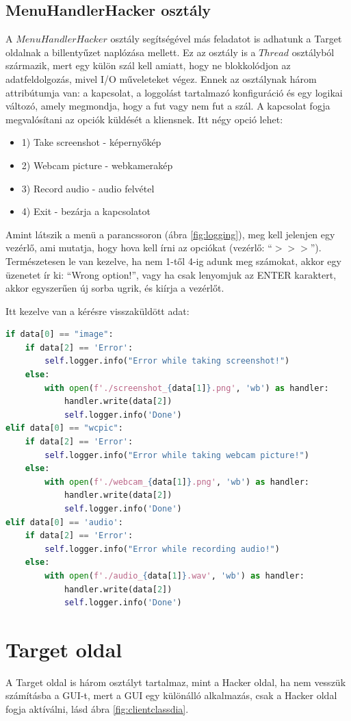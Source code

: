 \documentclass[12pt,a4paper,oneside]{report}
\begin{document}
\subsection{MenuHandlerHacker osztály}\label{subsubsec:menuhandler}
A $MenuHandlerHacker$ osztály segítségével más feladatot is adhatunk a Target oldalnak a billentyűzet naplózása mellett. Ez az osztály is a $Thread$ osztályból származik, mert egy külön szál kell amiatt, hogy ne blokkolódjon az adatfeldolgozás, mivel I/O műveleteket végez.  Ennek az osztálynak három attribútumja van: a kapcsolat, a loggolást tartalmazó konfiguráció és egy logikai változó, amely megmondja, hogy a fut vagy nem fut a szál. A kapcsolat fogja megvalósítani az opciók küldését a kliensnek. Itt négy opció lehet:
\begin{itemize}
\item 1) Take screenshot - képernyőkép
\item 2) Webcam picture - webkamerakép
\item 3) Record audio - audio felvétel
\item 4) Exit - bezárja a kapcsolatot
\end{itemize}

Amint látszik a menü a parancssoron (ábra \ref{fig:logging}), meg kell jelenjen egy vezérlő, ami mutatja, hogy hova kell írni az opciókat (vezérlő: ``$>>>$'').
Természetesen le van kezelve, ha nem 1-től 4-ig adunk meg számokat, akkor egy üzenetet ír ki: ``Wrong option!'', vagy ha csak lenyomjuk az ENTER karaktert, akkor egyszerűen új sorba ugrik, és kiírja a vezérlőt.

Itt kezelve van a kérésre visszaküldött adat:
\begin{lstlisting}[language=Python]
if data[0] == "image":
	if data[2] == 'Error':
		self.logger.info("Error while taking screenshot!")
	else:
		with open(f'./screenshot_{data[1]}.png', 'wb') as handler:
			handler.write(data[2])
			self.logger.info('Done')
elif data[0] == "wcpic":
	if data[2] == 'Error':
		self.logger.info("Error while taking webcam picture!")
	else:
		with open(f'./webcam_{data[1]}.png', 'wb') as handler:
			handler.write(data[2])
			self.logger.info('Done')
elif data[0] == 'audio':
	if data[2] == 'Error':
		self.logger.info("Error while recording audio!")
	else:
		with open(f'./audio_{data[1]}.wav', 'wb') as handler:
			handler.write(data[2])
			self.logger.info('Done')
\end{lstlisting}

\section{Target oldal}\label{subsec:client}
A Target oldal is három osztályt tartalmaz, mint a Hacker oldal, ha nem vesszük számításba a GUI-t, mert a GUI egy különálló alkalmazás, csak a Hacker oldal fogja aktíválni, lásd ábra \ref{fig:clientclassdia}.
\end{document}
